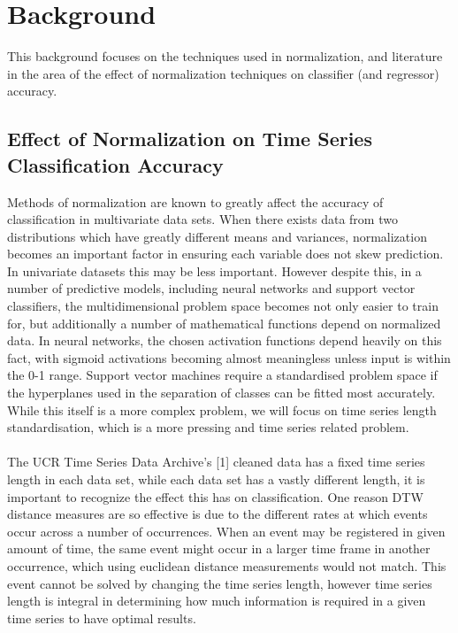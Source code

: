 \documentclass[10pt,a4paper]{article}
\begin{document}
\section{Background}

This background focuses on the techniques used in normalization, and literature in the area of the effect of normalization techniques on classifier (and regressor) accuracy.

\subsection{Effect of Normalization on Time Series Classification Accuracy}

Methods of normalization are known to greatly affect the accuracy of classification in multivariate data sets.
When there exists data from two distributions which have greatly different means and variances, normalization becomes an important factor in ensuring each variable does not skew prediction.
In univariate datasets this may be less important.
However despite this, in a number of predictive models, including neural networks and support vector classifiers, the multidimensional problem space becomes not only easier to train for, but additionally a number of mathematical functions depend on normalized data.
In neural networks, the chosen activation functions depend heavily on this fact, with sigmoid activations becoming almost meaningless unless input is within the 0-1 range.
Support vector machines require a standardised problem space if the hyperplanes used in the separation of classes can be fitted most accurately.
While this itself is a more complex problem, we will focus on time series length standardisation, which is a more pressing and time series related problem.
\\\\
The UCR Time Series Data Archive's [1] cleaned data has a fixed time series length in each data set, while each data set has a vastly different length, it is important to recognize the effect this has on classification.
One reason DTW distance measures are so effective is due to the different rates at which events occur across a number of occurrences.
When an event may be registered in given amount of time, the same event might occur in a larger time frame in another occurrence, which using euclidean distance measurements would not match.
This event cannot be solved by changing the time series length, however time series length is integral in determining how much information is required in a given time series to have optimal results.
\end{document}
